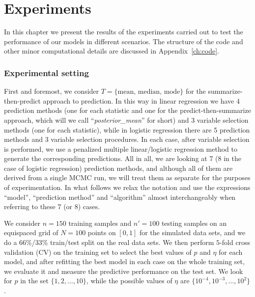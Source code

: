 %
%

\let\epsilon\varepsilon

\chapter{Experiments}\label{ch:experiments}

In this chapter we present the results of the experiments carried out to test the performance of our models in different scenarios. The structure of the code and other minor computational details are discussed in Appendix~\ref{ch:code}.

\subsection*{Experimental setting}

First and foremost, we consider \(T=\{\text{mean, median, mode}\}\) for the summarize-then-predict approach to prediction. In this way in linear regression we have 4 prediction methods (one for each statistic and one for the predict-then-summarize approach, which will we call ``\textit{posterior\_mean}'' for short) and 3 variable selection methods (one for each statistic), while in logistic regression there are 5 prediction methods and 3 variable selection procedures. In each case, after variable selection is performed, we use a penalized multiple linear/logistic regression method to generate the corresponding predictions. All in all, we are looking at 7 (8 in the case of logistic regression) prediction methods, and although all of them are derived from a single MCMC run, we will treat them as separate for the purposes of experimentation. In what follows we relax the notation and use the expressions ``model'', ``prediction method'' and ``algorithm'' almost interchangeably when referring to these 7 (or 8) cases.

We consider \(n=150\) training samples and \(n'=100\) testing samples on an equispaced grid of \(N=100\) points on \([0, 1]\) for the simulated data sets, and we do a 66\%/33\% train/test split on the real data sets. We then perform \(5\)-fold cross validation (CV) on the training set to select the best values of \(p\) and \(\eta\) for each model, and after refitting the best model in each case on the whole training set, we evaluate it and measure the predictive performance on the test set. We look for \(p\) in the set \(\{1,2,\dots,10\}\), while the possible values of \(\eta\) are \(\{10^{-4}, 10^{-3}, \dots, 10^2\}\).

